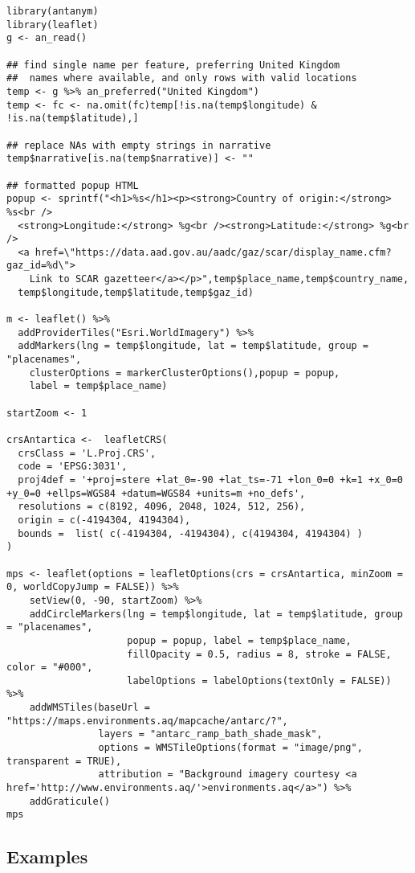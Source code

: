 \documentclass[]{article}
\begin{document}
\begin{verbatim}
library(antanym)
library(leaflet)
g <- an_read()

## find single name per feature, preferring United Kingdom
##  names where available, and only rows with valid locations
temp <- g %>% an_preferred("United Kingdom")
temp <- fc <- na.omit(fc)temp[!is.na(temp$longitude) & !is.na(temp$latitude),]

## replace NAs with empty strings in narrative
temp$narrative[is.na(temp$narrative)] <- ""

## formatted popup HTML
popup <- sprintf("<h1>%s</h1><p><strong>Country of origin:</strong> %s<br />
  <strong>Longitude:</strong> %g<br /><strong>Latitude:</strong> %g<br />
  <a href=\"https://data.aad.gov.au/aadc/gaz/scar/display_name.cfm?gaz_id=%d\">
    Link to SCAR gazetteer</a></p>",temp$place_name,temp$country_name,
  temp$longitude,temp$latitude,temp$gaz_id)

m <- leaflet() %>%
  addProviderTiles("Esri.WorldImagery") %>%
  addMarkers(lng = temp$longitude, lat = temp$latitude, group = "placenames",
    clusterOptions = markerClusterOptions(),popup = popup,
    label = temp$place_name)

startZoom <- 1

crsAntartica <-  leafletCRS(
  crsClass = 'L.Proj.CRS',
  code = 'EPSG:3031',
  proj4def = '+proj=stere +lat_0=-90 +lat_ts=-71 +lon_0=0 +k=1 +x_0=0 +y_0=0 +ellps=WGS84 +datum=WGS84 +units=m +no_defs',
  resolutions = c(8192, 4096, 2048, 1024, 512, 256),
  origin = c(-4194304, 4194304),
  bounds =  list( c(-4194304, -4194304), c(4194304, 4194304) )
)

mps <- leaflet(options = leafletOptions(crs = crsAntartica, minZoom = 0, worldCopyJump = FALSE)) %>%
    setView(0, -90, startZoom) %>%
    addCircleMarkers(lng = temp$longitude, lat = temp$latitude, group = "placenames",
                     popup = popup, label = temp$place_name,
                     fillOpacity = 0.5, radius = 8, stroke = FALSE, color = "#000",
                     labelOptions = labelOptions(textOnly = FALSE)) %>%
    addWMSTiles(baseUrl = "https://maps.environments.aq/mapcache/antarc/?",
                layers = "antarc_ramp_bath_shade_mask",
                options = WMSTileOptions(format = "image/png", transparent = TRUE),
                attribution = "Background imagery courtesy <a href='http://www.environments.aq/'>environments.aq</a>") %>%
    addGraticule()
mps
\end{verbatim}

\subsection{Examples}\label{examples}
\end{document}
